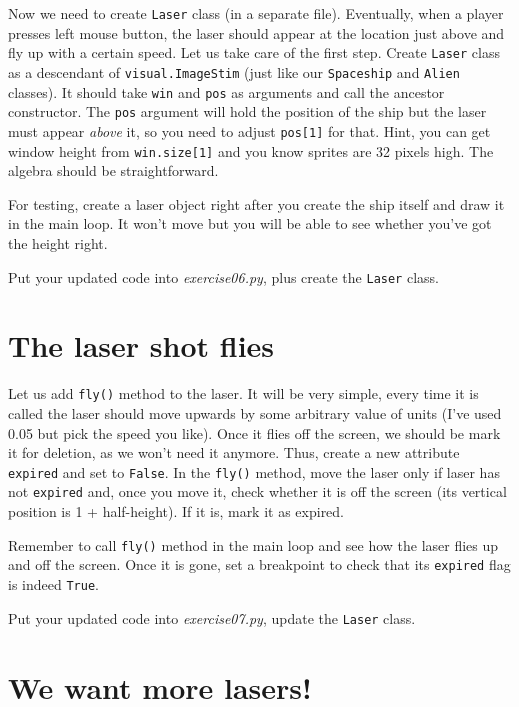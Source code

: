 \documentclass[
]{book}
\begin{document}
Now we need to create \texttt{Laser} class (in a separate file). Eventually, when a player presses left mouse button, the laser should appear at the location just above and fly up with a certain speed. Let us take care of the first step. Create \texttt{Laser} class as a descendant of \texttt{visual.ImageStim} (just like our \texttt{Spaceship} and \texttt{Alien} classes). It should take \texttt{win} and \texttt{pos} as arguments and call the ancestor constructor. The \texttt{pos} argument will hold the position of the ship but the laser must appear \emph{above} it, so you need to adjust \texttt{pos{[}1{]}} for that. Hint, you can get window height from \texttt{win.size{[}1{]}} and you know sprites are 32 pixels high. The algebra should be straightforward.

For testing, create a laser object right after you create the ship itself and draw it in the main loop. It won't move but you will be able to see whether you've got the height right.

Put your updated code into \emph{exercise06.py}, plus create the \texttt{Laser} class.

\hypertarget{the-laser-shot-flies}{%
\section{The laser shot flies}\label{the-laser-shot-flies}}

Let us add \texttt{fly()} method to the laser. It will be very simple, every time it is called the laser should move upwards by some arbitrary value of units (I've used 0.05 but pick the speed you like). Once it flies off the screen, we should be mark it for deletion, as we won't need it anymore. Thus, create a new attribute \texttt{expired} and set to \texttt{False}. In the \texttt{fly()} method, move the laser only if laser has not \texttt{expired} and, once you move it, check whether it is off the screen (its vertical position is 1 + half-height). If it is, mark it as expired.

Remember to call \texttt{fly()} method in the main loop and see how the laser flies up and off the screen. Once it is gone, set a breakpoint to check that its \texttt{expired} flag is indeed \texttt{True}.

Put your updated code into \emph{exercise07.py}, update the \texttt{Laser} class.

\hypertarget{we-want-more-lasers}{%
\section{We want more lasers!}\label{we-want-more-lasers}}
\end{document}

